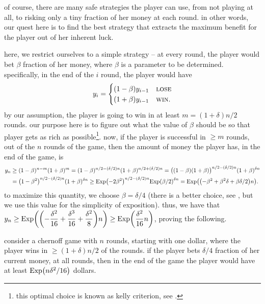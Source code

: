 of course, there are many safe strategies the player can use, from not
playing at all, to risking only a tiny fraction of her money at each
round.  in other words, our quest here is to find the best strategy
that extracts the maximum benefit for the player out of her inherent
luck.

here, we restrict ourselves to a simple strategy -- at every round,
the player would bet $\beta$ fraction of her money, where $\beta$ is a
parameter to be determined.  specifically, in the end of the $i$\th
round, the player would have
\begin{align*}
    y_{i} = \begin{cases}
        (1-\beta) y_{i-1}  & \text{\textsc{lose}}\\
        (1+\beta) y_{i-1} & \text{\textsc{win}}.
    \end{cases}
\end{align*}
by our assumption, the player is going to win in at least
$m=(1+\delta)n/2$ rounds.  our purpose here is to figure out what the
value of $\beta$ should be so that player gets as rich as
possible\footnote{this optimal choice is known as kelly criterion,
   see .}.  now, if the player is successful in $\geq m$
rounds, out of the $n$ rounds of the game, then the amount of money
the player has, in the end of the game, is
\begin{align*}
    y_n%
    &\geq%
    (1-\beta)^{n-m} (1+\beta)^m%
    =%
    (1-\beta)^{n/2 -(\delta/2)n} (1+\beta)^{n/2 +(\delta/2)n}%
    =%
    \pth[]{\big. (1-\beta)(1+\beta)}^{n/2 -(\delta/2)n}
    (1+\beta)^{\delta n}%
    \\&%
    =%
    \pth[]{\big. 1-\beta^2 }^{n/2 -(\delta/2)n} (1+\beta)^{\delta n}%
    \geq%
    {\big. \Exp\pth{ -2\beta^2} }^{n/2 -(\delta/2)n}
    {\Exp\pth{\beta/2}}^{\delta n}%
    =%
    \Exp\pth{ \pth[]{ -\beta^2 +\beta^2 \delta + \beta \delta /2 } n
    }.
\end{align*}
to maximize this quantity, we choose $\beta = \delta/4$ (there is a
better choice, see , but we use this value for the
simplicity of exposition).  thus, we have that $\ds y_n \geq \Exp\pth{
   \pth[]{ -\frac{\delta^2}{16} + \frac{\delta^3}{16} +
      \frac{\delta^2}{8} } n } \geq \Exp\pth{ \frac{\delta^2}{16} n
}$, proving the following.

\begin{lemma}%
    consider a chernoff game with $n$ rounds, starting with one
    dollar, where the player wins in $\geq (1+\delta)n/2$ of the
    rounds. if the player bets $\delta/4$ fraction of her current
    money, at all rounds, then in the end of the game the player would
    have at least $\Exp\pth{n \delta^2 / 16}$ dollars.
\end{lemma}


